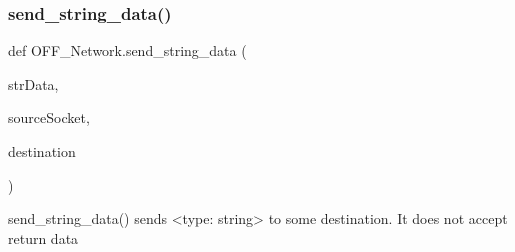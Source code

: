 \subsubsection{\texorpdfstring{send\+\_\+string\+\_\+data()}{send\_string\_data()}}
{\footnotesize\ttfamily def O\+F\+F\+\_\+\+Network.\+send\+\_\+string\+\_\+data (\begin{DoxyParamCaption}\item[{}]{str\+Data,  }\item[{}]{source\+Socket,  }\item[{}]{destination }\end{DoxyParamCaption})}

\begin{DoxyVerb}send_string_data() sends <type: string> to some destination. It does not
accept return data
\end{DoxyVerb}
 